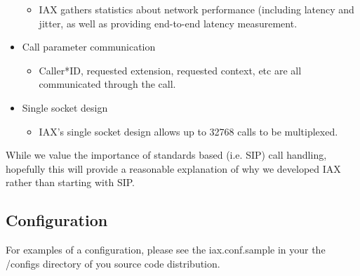 \begin{itemize}
\begin{itemize}
	     \item IAX gathers statistics about network performance (including 
	     latency and jitter, as well as providing end-to-end latency
	     measurement.
	\end{itemize}
	\item Call parameter communication
	\begin{itemize}
	     \item Caller*ID, requested extension, requested context, etc are
	     all communicated through the call.
	\end{itemize}
	\item Single socket design
	\begin{itemize}
	     \item IAX's single socket design allows up to 32768 calls to be 
	     multiplexed.
	\end{itemize}
\end{itemize}

While we value the importance of standards based (i.e. SIP) call handling, 
hopefully this will provide a reasonable explanation of why we developed 
IAX rather than starting with SIP.

\subsection{Configuration}

For examples of a configuration, please see the iax.conf.sample in
your the /configs directory of you source code distribution.
